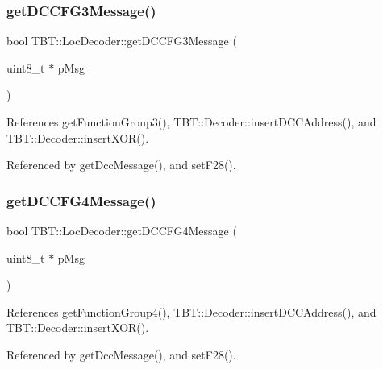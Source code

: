 \subsubsection{\texorpdfstring{get\+D\+C\+C\+F\+G3\+Message()}{getDCCFG3Message()}}
{\footnotesize\ttfamily bool T\+B\+T\+::\+Loc\+Decoder\+::get\+D\+C\+C\+F\+G3\+Message (\begin{DoxyParamCaption}\item[{uint8\+\_\+t $\ast$}]{p\+Msg }\end{DoxyParamCaption})\hspace{0.3cm}{\ttfamily [protected]}}



References get\+Function\+Group3(), T\+B\+T\+::\+Decoder\+::insert\+D\+C\+C\+Address(), and T\+B\+T\+::\+Decoder\+::insert\+X\+O\+R().



Referenced by get\+Dcc\+Message(), and set\+F28().

\mbox{\label{classTBT_1_1LocDecoder_a4558d6f31f10579bd0ee526ee453dedd_a4558d6f31f10579bd0ee526ee453dedd}} 
\subsubsection{\texorpdfstring{get\+D\+C\+C\+F\+G4\+Message()}{getDCCFG4Message()}}
{\footnotesize\ttfamily bool T\+B\+T\+::\+Loc\+Decoder\+::get\+D\+C\+C\+F\+G4\+Message (\begin{DoxyParamCaption}\item[{uint8\+\_\+t $\ast$}]{p\+Msg }\end{DoxyParamCaption})\hspace{0.3cm}{\ttfamily [protected]}}



References get\+Function\+Group4(), T\+B\+T\+::\+Decoder\+::insert\+D\+C\+C\+Address(), and T\+B\+T\+::\+Decoder\+::insert\+X\+O\+R().



Referenced by get\+Dcc\+Message(), and set\+F28().

\mbox{\label{classTBT_1_1LocDecoder_af25136b90116412d8163fde688893061_af25136b90116412d8163fde688893061}} 
